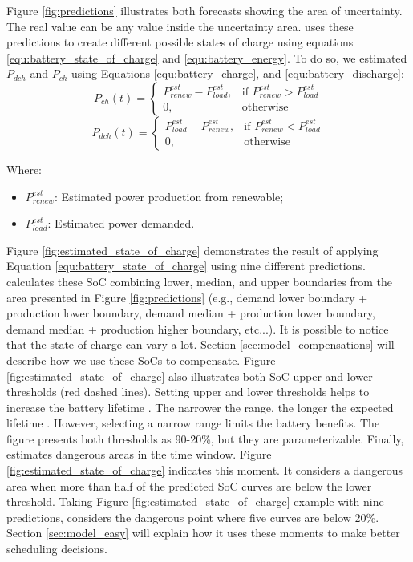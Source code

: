 Figure \ref{fig:predictions} illustrates both forecasts showing the area of uncertainty. The real value can be any value inside the uncertainty area. \emph{\systemName} uses these predictions to create different possible states of charge using equations \ref{equ:battery_state_of_charge} and \ref{equ:battery_energy}. To do so, we estimated $P_{dch}$ and $P_{ch}$ using Equations \ref{equ:battery_charge}, and \ref{equ:battery_discharge}: 
\begin{equation}
    \label{equ:battery_charge}
    P_{ch}(t) = 
    \begin{cases}
        P_{renew}^{est} - P_{load}^{est},& \text{if } P_{renew}^{est} > P_{load}^{est} \\
        0,              & \text{otherwise}
    \end{cases}
\end{equation}
\begin{equation}
    \label{equ:battery_discharge}
    P_{dch}(t) = 
    \begin{cases}
        P_{load}^{est} - P_{renew}^{est},& \text{if } P_{renew}^{est} < P_{load}^{est} \\
        0,              & \text{otherwise}
    \end{cases}
\end{equation}

Where:
\begin{itemize}
    \item \(P_{renew}^{est}\): Estimated power production from renewable;
    \item \(P_{load}^{est}\): Estimated power demanded.
\end{itemize}

Figure \ref{fig:estimated_state_of_charge} demonstrates the result of applying Equation \ref{equ:battery_state_of_charge} using nine different predictions. \emph{\systemName} calculates these SoC combining lower, median, and upper boundaries from the area presented in Figure \ref{fig:predictions} (e.g., demand lower boundary + production lower boundary, demand median + production lower boundary, demand median + production higher boundary, etc...). It is possible to notice that the state of charge can vary a lot. Section \ref{sec:model_compensations} will describe how we use these SoCs to compensate. Figure \ref{fig:estimated_state_of_charge} also illustrates both SoC upper and lower thresholds (red dashed lines). Setting upper and lower thresholds helps to increase the battery lifetime \cite{xu2016modeling}. The narrower the range, the longer the expected lifetime \cite{xu2016modeling}. However, selecting a narrow range limits the battery benefits. The figure presents both thresholds as 90-20\%, but they are parameterizable. Finally, \emph{\systemName} estimates dangerous areas in the time window. Figure \ref{fig:estimated_state_of_charge} indicates this moment. It considers a dangerous area when more than half of the predicted SoC curves are below the lower threshold. Taking Figure \ref{fig:estimated_state_of_charge} example with nine predictions, \emph{\systemName} considers the dangerous point where five curves are below 20\%. Section \ref{sec:model_easy} will explain how it uses these moments to make better scheduling decisions.

